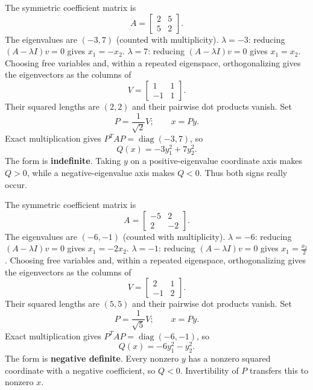 The symmetric coefficient matrix is
\[
 A=\begin{bmatrix}2&5\\5&2\end{bmatrix}.
\]
The eigenvalues are $(-3,7)$ (counted with multiplicity).
$\lambda=-3$: reducing $(A-\lambda I)v=0$ gives
\( x_{1}=- x_{2} \).
$\lambda=7$: reducing $(A-\lambda I)v=0$ gives
\( x_{1}=x_{2} \).
Choosing free variables and, within a repeated eigenspace, orthogonalizing
gives the eigenvectors as the columns of
\[
 V=\begin{bmatrix}1&1\\-1&1\end{bmatrix}.
\]
Their squared lengths are $(2,2)$ and their pairwise dot products vanish. Set
\[
 P=\frac1{\sqrt{2}}V;\qquad x=Py.
\]
Exact multiplication gives $P^TAP=\operatorname{diag}(-3,7)$, so
\[
 Q(x)=\boxed{- 3 y_{1}^{2} + 7 y_{2}^{2}}.
\]
The form is \textbf{indefinite}. Taking $y$ on a positive-eigenvalue coordinate axis makes $Q>0$,
while a negative-eigenvalue axis makes $Q<0$. Thus both signs really occur.

The symmetric coefficient matrix is
\[
 A=\begin{bmatrix}-5&2\\2&-2\end{bmatrix}.
\]
The eigenvalues are $(-6,-1)$ (counted with multiplicity).
$\lambda=-6$: reducing $(A-\lambda I)v=0$ gives
\( x_{1}=- 2 x_{2} \).
$\lambda=-1$: reducing $(A-\lambda I)v=0$ gives
\( x_{1}=\frac{x_{2}}{2} \).
Choosing free variables and, within a repeated eigenspace, orthogonalizing
gives the eigenvectors as the columns of
\[
 V=\begin{bmatrix}2&1\\-1&2\end{bmatrix}.
\]
Their squared lengths are $(5,5)$ and their pairwise dot products vanish. Set
\[
 P=\frac1{\sqrt{5}}V;\qquad x=Py.
\]
Exact multiplication gives $P^TAP=\operatorname{diag}(-6,-1)$, so
\[
 Q(x)=\boxed{- 6 y_{1}^{2} - y_{2}^{2}}.
\]
The form is \textbf{negative definite}. Every nonzero $y$ has a nonzero squared coordinate with a negative
coefficient, so $Q<0$. Invertibility of $P$ transfers this to nonzero $x$.

